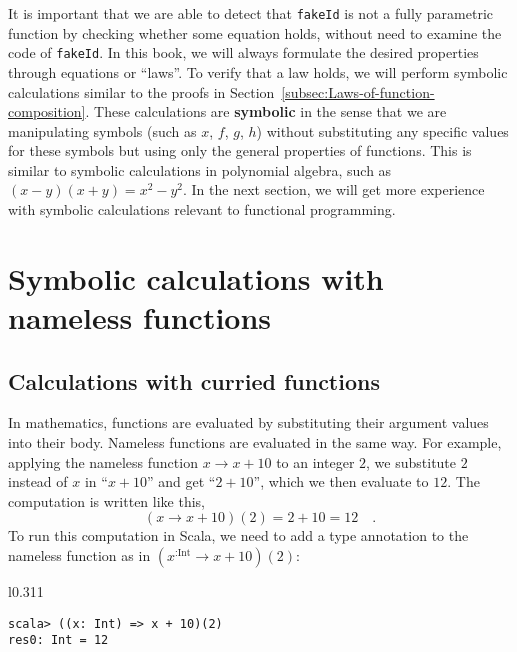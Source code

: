 \noindent It is important that we are able to detect that \lstinline!fakeId!
is not a fully parametric function by checking whether some equation
holds, without need to examine the code of \lstinline!fakeId!. In
this book, we will always formulate the desired properties through
equations or \textsf{``}laws\textsf{''}. To verify that a law holds, we will perform
symbolic calculations similar to the
proofs in Section~\ref{subsec:Laws-of-function-composition}. These
calculations are \textbf{symbolic} in the sense that we are manipulating
symbols (such as $x$, $f$, $g$, $h$) without substituting any
specific values for these symbols but using only the general properties
of functions. This is similar to symbolic calculations in polynomial
algebra, such as $\left(x-y\right)\left(x+y\right)=x^{2}-y^{2}$.
In the next section, we will get more experience with symbolic calculations
relevant to functional programming.

\section{Symbolic calculations with nameless functions}

\subsection{Calculations with curried functions}

In mathematics, functions are evaluated by substituting their argument
values into their body. Nameless functions are evaluated in the same
way. For example, applying the nameless function $x\rightarrow x+10$
to an integer $2$, we substitute $2$ instead of $x$ in \textquotedblleft $x+10$\textquotedblright{}
and get \textquotedblleft $2+10$\textquotedblright , which we then
evaluate to $12$. The computation is written like this, 
\[
(x\rightarrow x+10)(2)=2+10=12\quad.
\]
To run this computation in Scala, we need to add a type annotation
to the nameless function as in $(x^{:\text{Int}}\rightarrow x+10)(2)$:

\begin{wrapfigure}{l}{0.311\columnwidth}%
\vspace{-0.6\baselineskip}
\begin{lstlisting}
scala> ((x: Int) => x + 10)(2)
res0: Int = 12 
\end{lstlisting}

\vspace{-1.3\baselineskip}
\end{wrapfigure}%

